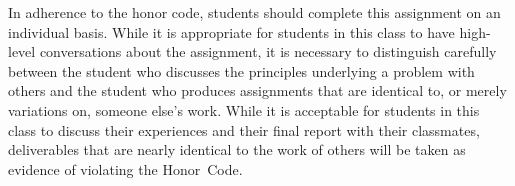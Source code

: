 In adherence to the honor code, students should complete this assignment on an individual basis. While it is appropriate for
students in this class to have high-level conversations about the assignment, it is necessary to distinguish carefully between the
student who discusses the principles underlying a problem with others and the student who produces assignments that are identical
to, or merely variations on, someone else's work.  While it is acceptable for students in this class to discuss their experiences
and their final report with their classmates, deliverables that are nearly identical to the work of others will be taken as
evidence of violating the \mbox{Honor Code}.  




